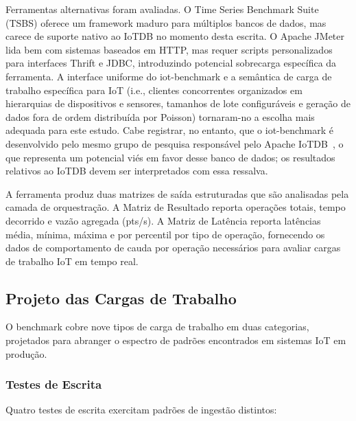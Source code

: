 Ferramentas alternativas foram avaliadas. O Time Series Benchmark Suite (TSBS) oferece um
framework maduro para múltiplos bancos de dados, mas carece de suporte nativo ao IoTDB no
momento desta escrita. O Apache JMeter lida bem com sistemas baseados em HTTP, mas requer scripts personalizados para interfaces
Thrift e JDBC, introduzindo potencial sobrecarga específica da ferramenta. A interface uniforme
do iot-benchmark e a semântica de carga de trabalho específica para IoT (i.e., clientes
  concorrentes organizados em hierarquias de dispositivos e sensores, tamanhos de lote
configuráveis e geração de dados fora de ordem distribuída por Poisson) tornaram-no a
escolha mais adequada para este estudo. Cabe registrar, no entanto, que o iot-benchmark é
desenvolvido pelo mesmo grupo de pesquisa responsável pelo Apache IoTDB~\citep{iotbenchmark},
o que representa um potencial viés em favor desse banco de dados; os resultados relativos ao
IoTDB devem ser interpretados com essa ressalva.

A ferramenta produz duas matrizes de saída estruturadas que são analisadas pela camada de
orquestração. A Matriz de Resultado reporta operações totais, tempo decorrido e vazão agregada
(pts/s). A Matriz de Latência reporta latências média, mínima, máxima e por percentil por tipo
de operação, fornecendo os dados de comportamento de cauda por operação necessários para
avaliar cargas de trabalho IoT em tempo real.

\subsection{Projeto das Cargas de Trabalho}
\label{sec:workload}

O benchmark cobre nove tipos de carga de trabalho em duas categorias, projetados para abranger
o espectro de padrões encontrados em sistemas IoT em produção.

\subsubsection{Testes de Escrita}

Quatro testes de escrita exercitam padrões de ingestão distintos:

